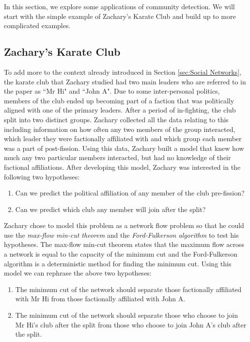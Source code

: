In this section, we explore some applications of community detection. We will start with the simple example of Zachary's Karate Club and build up to more complicated examples.

\subsection{Zachary's Karate Club}
To add more to the context already introduced in Section \ref{sec:Social Networks}, the karate club that Zachary studied had two main leaders who are referred to in the paper as ``Mr Hi" and ``John A". Due to some inter-personal politics, members of the club ended up becoming part of a faction that was politically aligned with one of the primary leaders. After a period of in-fighting, the club split into two distinct groups. Zachary collected all the data relating to this including information on how often any two members of the group interacted, which leader they were factionally affiliated with and which group each member was a part of post-fission. Using this data, Zachary built a model that knew how much any two particular members interacted, but had no knowledge of their factional affiliations. After developing this model, Zachary was interested in the following two hypotheses:

\begin{enumerate}
    \item Can we predict the political affiliation of any member of the club pre-fission?
    \item Can we predict which club any member will join after the split?
\end{enumerate}

Zachary chose to model this problem as a network flow problem so that he could use the \emph{max-flow min-cut theorem} and the \emph{Ford-Fulkerson algorithm}\cite{ford_fulkerson_1956} to test his hypotheses. The max-flow min-cut theorem states that the maximum flow across a network is equal to the capacity of the minimum cut and the Ford-Fulkerson algorithm is a deterministic method for finding the minimum cut. Using this model we can rephrase the above two hypotheses:

\begin{enumerate}
    \item The minimum cut of the network should separate those factionally affiliated with Mr Hi from those factionally affiliated with John A.
    \item The minimum cut of the network should separate those who choose to join Mr Hi's club after the split from those who choose to join John A's club after the split.
\end{enumerate}

